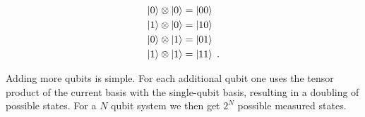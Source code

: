 \begin{gather}
\begin{aligned}
    \ket{0} \otimes \ket{0} &= \ket{00} \\
    \ket{1} \otimes \ket{0} &= \ket{10} \\
    \ket{0} \otimes \ket{1} &= \ket{01} \\
    \ket{1} \otimes \ket{1} &= \ket{11} \; .
\end{aligned}
\end{gather}

Adding more qubits is simple. For each additional qubit one uses the tensor product of the current basis with the single-qubit basis, resulting in a doubling of possible states. For a $N$ qubit system we then get $2^N$ possible measured states.

